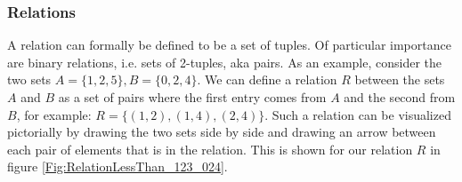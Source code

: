 

\subsubsection{Relations}
A relation can formally be defined to be a set of tuples. Of particular importance are binary relations, i.e. sets of 2-tuples, aka pairs. As an example, consider the two sets $A = \{1,2,5\}, B = \{0,2,4\}$. We can define a relation $R$ between the sets $A$ and $B$ as a set of pairs where the first entry comes from $A$ and the second from $B$, for example: $R = \{(1,2),(1,4),(2,4)\}$. Such a relation can be visualized pictorially by drawing the two sets side by side and drawing an arrow between each pair of elements that is in the relation. This is shown for our relation $R$ in figure \ref{Fig:RelationLessThan_123_024}.

